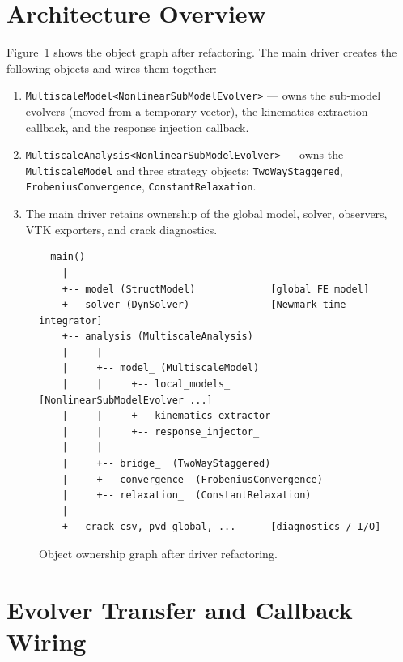 \section{Architecture Overview}
\label{sec:driver-arch}

Figure~\ref{fig:driver-arch} shows the object graph after
refactoring.  The main driver creates the following objects and wires
them together:

\begin{enumerate}
  \item \texttt{MultiscaleModel<NonlinearSubModelEvolver>} --- owns the
    sub-model evolvers (moved from a temporary vector), the kinematics
    extraction callback, and the response injection callback.
  \item \texttt{MultiscaleAnalysis<NonlinearSubModelEvolver>} --- owns
    the \texttt{MultiscaleModel} and three strategy objects:
    \texttt{TwoWayStaggered}, \texttt{FrobeniusConvergence},
    \texttt{ConstantRelaxation}.
  \item The main driver retains ownership of the global model, solver,
    observers, VTK exporters, and crack diagnostics.
\end{enumerate}

\begin{figure}[htb]
\centering
\small
\begin{verbatim}
  main()
    |
    +-- model (StructModel)             [global FE model]
    +-- solver (DynSolver)              [Newmark time integrator]
    +-- analysis (MultiscaleAnalysis)
    |     |
    |     +-- model_ (MultiscaleModel)
    |     |     +-- local_models_       [NonlinearSubModelEvolver ...]
    |     |     +-- kinematics_extractor_
    |     |     +-- response_injector_
    |     |
    |     +-- bridge_  (TwoWayStaggered)
    |     +-- convergence_ (FrobeniusConvergence)
    |     +-- relaxation_  (ConstantRelaxation)
    |
    +-- crack_csv, pvd_global, ...      [diagnostics / I/O]
\end{verbatim}
\caption{Object ownership graph after driver refactoring.}
\label{fig:driver-arch}
\end{figure}


\section{Evolver Transfer and Callback Wiring}
\label{sec:driver-transfer}

